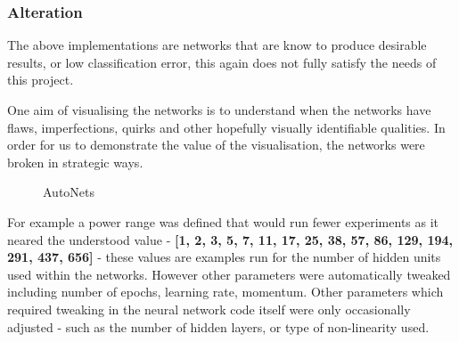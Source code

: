 \documentclass[a4paper,11pt,titlepage]{article}
\begin{document}
		\subsubsection{Alteration}
		The above implementations are networks that are know to produce desirable results, or low classification error, this again does not fully satisfy the needs of this project.
		\par 
		One aim of visualising the networks is to understand when the networks have flaws, imperfections, quirks and other hopefully visually identifiable qualities. In order for us to demonstrate the value of the visualisation, the networks were broken in strategic ways. 
		
	\begin{figure}[H]
    			\caption{AutoNets}%
	\end{figure}	
	
		\par 
		For example a power range was defined that would run fewer experiments as it neared the understood value - \textbf{[1, 2, 3, 5, 7, 11, 17, 25, 38, 57, 86, 129, 194, 291, 437, 656]} - these values are examples run for the number of hidden units used within the networks. However other parameters were automatically tweaked including number of epochs, learning rate, momentum. Other parameters which required tweaking in the neural network code itself were only occasionally adjusted - such as the number of hidden layers, or type of non-linearity used.
							

		
\end{document}
